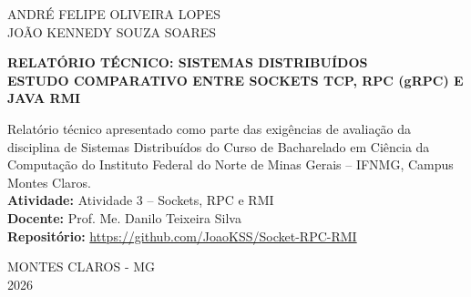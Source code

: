 \documentclass[12pt, a4paper]{article}
\begin{document}
\begin{titlepage}
\begin{center}
        \vfill

        \normalsize
        ANDRÉ FELIPE OLIVEIRA LOPES \\
        JOÃO KENNEDY SOUZA SOARES \\

        \vfill

        \textbf{\large RELATÓRIO TÉCNICO: SISTEMAS DISTRIBUÍDOS}\\[0.35cm]
        \textbf{\normalsize ESTUDO COMPARATIVO ENTRE SOCKETS TCP, RPC (gRPC) E JAVA RMI} \\

        \vfill

        \hfill
        \begin{minipage}{0.52\textwidth}
            \small
            Relatório técnico apresentado como parte das exigências de avaliação da disciplina de Sistemas Distribuídos do Curso de Bacharelado em Ciência da Computação do Instituto Federal do Norte de Minas Gerais -- IFNMG, Campus Montes Claros. \\
            
            \vspace{0.3cm}
            \textbf{Atividade:} Atividade 3 -- Sockets, RPC e RMI \\
            \textbf{Docente:} Prof. Me. Danilo Teixeira Silva \\
            \textbf{Repositório:} \url{https://github.com/JoaoKSS/Socket-RPC-RMI}
        \end{minipage}

        \vfill

        \normalsize
        MONTES CLAROS - MG \\
        2026
    \end{center}
\end{titlepage}

\pagestyle{fancy}

\end{document}
